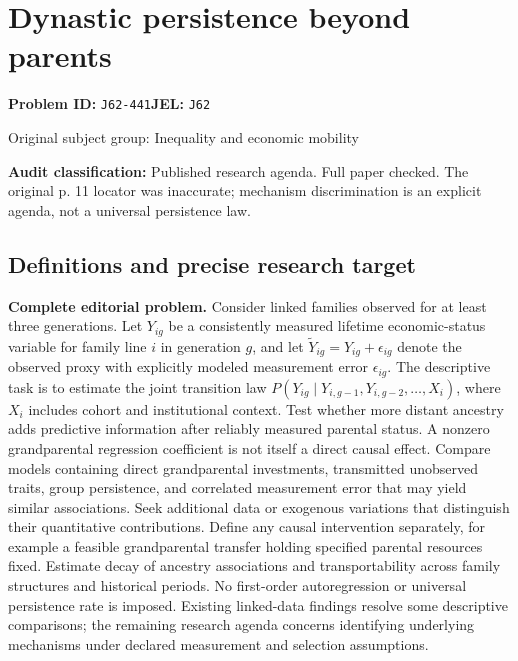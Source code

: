 \documentclass[11pt,a4paper]{article}
\begin{document}
\section*{Dynastic persistence beyond parents}
\textbf{Problem ID:} \texttt{J62-441}\quad \textbf{JEL:} \texttt{J62}\par
\label{problem:OP-0364}
{\sffamily\small\color{muted}Original subject group: Inequality and economic mobility\par}
\label{definitions:problem:30007646}
\textbf{Audit classification:} Published research agenda. Full paper checked. The original p. 11 locator was inaccurate; mechanism discrimination is an explicit agenda, not a universal persistence law.
\subsection*{Definitions and precise research target}
\textbf{Complete editorial problem.} Consider linked families observed for at least three generations. Let \(Y_{ig}\) be a consistently measured lifetime economic-status variable for family line \(i\) in generation \(g\), and let \(\widetilde Y_{ig}=Y_{ig}+\epsilon_{ig}\) denote the observed proxy with explicitly modeled measurement error \(\epsilon_{ig}\). The descriptive task is to estimate the joint transition law \(P(Y_{ig}\mid Y_{i,g-1},Y_{i,g-2},\ldots,X_i)\), where \(X_i\) includes cohort and institutional context. Test whether more distant ancestry adds predictive information after reliably measured parental status. A nonzero grandparental regression coefficient is not itself a direct causal effect. Compare models containing direct grandparental investments, transmitted unobserved traits, group persistence, and correlated measurement error that may yield similar associations. Seek additional data or exogenous variations that distinguish their quantitative contributions. Define any causal intervention separately, for example a feasible grandparental transfer holding specified parental resources fixed. Estimate decay of ancestry associations and transportability across family structures and historical periods. No first-order autoregression or universal persistence rate is imposed. Existing linked-data findings resolve some descriptive comparisons; the remaining research agenda concerns identifying underlying mechanisms under declared measurement and selection assumptions.
\end{document}
